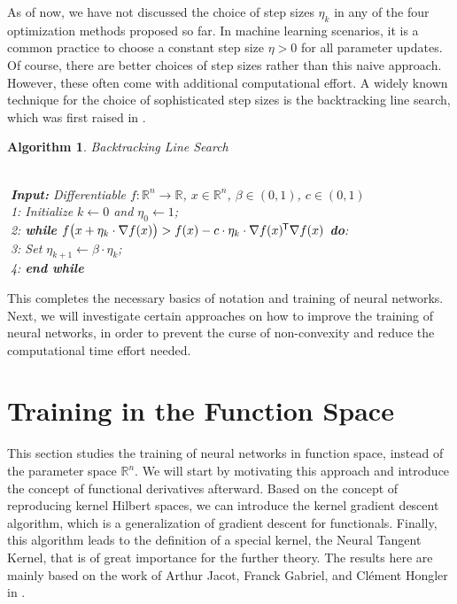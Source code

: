 \documentclass[11pt, a4paper]{article}
\newtheorem{algorithm}[theorem]{Algorithm}
\newcommand{\R}{\mathbb{R}}
\newcommand*{\tr}{^{\mkern-1.5mu\mathsf{T}}}
\begin{document}
As of now, we have not discussed the choice of step sizes $\eta_k$ in any of the four optimization methods proposed so far. In machine learning scenarios, it is a common practice to choose a constant step size $\eta > 0$ for all parameter updates. Of course, there are better choices of step sizes rather than this naive approach. However, these often come with additional computational effort. A widely known technique for the choice of sophisticated step sizes is the backtracking line search, which was first raised in \cite{Armijo}. 
\begin{algorithm} 
\caption{Backtracking Line Search \textcolor{white}{$\Big |$}} \ \\
\textcolor{white}{$\Big |$}\textbf{Input:} Differentiable $f: \R^n \to \R$, $x \in \R^n$, $\beta \in (0,1)$, $c \in (0,1)$ \\ 
\textcolor{white}{$\Big |$}1: Initialize $k \leftarrow 0$ and $\eta_0 \leftarrow 1$; \\
\textcolor{white}{$\Big |$}2: \textbf{while} $f \big (x + \eta_k \cdot \nabla f(x) \big) > f(x) - c \cdot \eta_k \cdot \nabla f(x) \tr \nabla f(x)$ \textbf{do}: \\
\textcolor{white}{$\Big |$}3: \quad Set $\eta_{k+1} \leftarrow \beta \cdot \eta_k$; \\
\textcolor{white}{$\Big |$}4: \textbf{end while}
\end{algorithm}

This completes the necessary basics of notation and training of neural networks. Next, we will investigate certain approaches on how to improve the training of neural networks, in order to prevent the curse of non-convexity and reduce the computational  time effort needed. \\

\pagebreak
\section{Training in the Function Space} \label{sec:functionspace}

This section studies the training of neural networks in function space, instead of the parameter space $\R^n$. We will start by motivating this approach and introduce the concept of functional derivatives afterward. Based on the concept of reproducing kernel Hilbert spaces, we can introduce the kernel gradient descent algorithm, which is a generalization of gradient descent for functionals. Finally, this algorithm leads to the definition of a special kernel, the Neural Tangent Kernel, that is of great importance for the further theory. The results here are mainly based on the work of Arthur Jacot, Franck Gabriel, and Cl\'{e}ment Hongler in \cite{NTK}.
\end{document}
